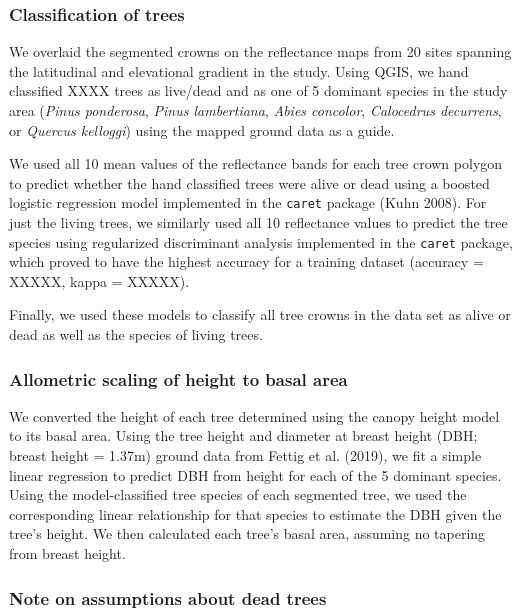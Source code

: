 \documentclass[]{article}
\begin{document}
\subsubsection{Classification of trees}\label{classification-of-trees}

We overlaid the segmented crowns on the reflectance maps from 20 sites
spanning the latitudinal and elevational gradient in the study. Using
QGIS, we hand classified XXXX trees as live/dead and as one of 5
dominant species in the study area (\emph{Pinus ponderosa}, \emph{Pinus
lambertiana}, \emph{Abies concolor}, \emph{Calocedrus decurrens}, or
\emph{Quercus kelloggi}) using the mapped ground data as a guide.

We used all 10 mean values of the reflectance bands for each tree crown
polygon to predict whether the hand classified trees were alive or dead
using a boosted logistic regression model implemented in the
\texttt{caret} package (Kuhn 2008). For just the living trees, we
similarly used all 10 reflectance values to predict the tree species
using regularized discriminant analysis implemented in the
\texttt{caret} package, which proved to have the highest accuracy for a
training dataset (accuracy = XXXXX, kappa = XXXXX).

Finally, we used these models to classify all tree crowns in the data
set as alive or dead as well as the species of living trees.

\subsubsection{Allometric scaling of height to basal
area}\label{allometric-scaling-of-height-to-basal-area}

We converted the height of each tree determined using the canopy height
model to its basal area. Using the tree height and diameter at breast
height (DBH; breast height = 1.37m) ground data from Fettig et al.
(2019), we fit a simple linear regression to predict DBH from height for
each of the 5 dominant species. Using the model-classified tree species
of each segmented tree, we used the corresponding linear relationship
for that species to estimate the DBH given the tree's height. We then
calculated each tree's basal area, assuming no tapering from breast
height.

\subsubsection{Note on assumptions about dead
trees}\label{note-on-assumptions-about-dead-trees}
\end{document}
